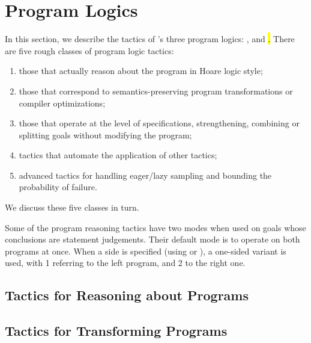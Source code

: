 \section{Program Logics}
\label{sec:programlogics}

In this section, we describe the tactics of \EasyCrypt's three program
logics: \prhl, \phl and \hl.  There are five rough classes of program
logic tactics:
\begin{enumerate}
\item those that actually reason about the program in Hoare logic
  style;

\item those that correspond to semantics-preserving program
  transformations or compiler optimizations;

\item those that operate at the level of specifications,
  strengthening, combining or splitting goals without modifying the
  program;

\item tactics that automate the application of other tactics;

\item advanced tactics for handling eager/lazy sampling and bounding
  the probability of failure.
\end{enumerate}
We discuss these five classes in turn.

Some of the program reasoning tactics have two modes when used on
goals whose conclusions are \prhl statement judgements.  Their default
mode is to operate on both programs at once. When a side is specified
(using  or ), a one-sided variant is
used, with 1 referring to the left program, and 2 to the right one.

\subsection{Tactics for Reasoning about Programs}
\label{subsec:reasoningprograms}











\subsection{Tactics for Transforming Programs}
\label{subsec:transformingprograms}

